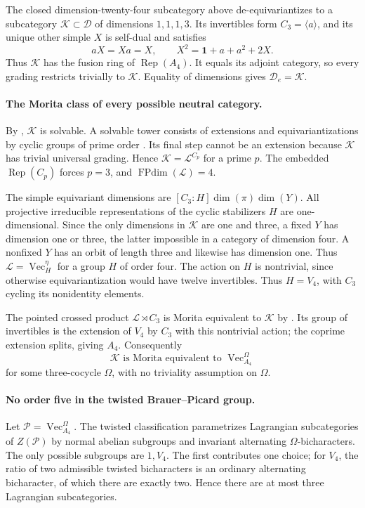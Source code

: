 The closed dimension-twenty-four subcategory above de-equivariantizes
to a subcategory $\mathcal K\subset\mathcal D$ of dimensions $1,1,1,3$.
Its invertibles form $C_3=\langle a\rangle$, and its unique other simple
$X$ is self-dual and satisfies
\[
 aX=Xa=X,\qquad X^2=\mathbf1+a+a^2+2X.
\]
Thus $\mathcal K$ has the fusion ring of $\operatorname{Rep}(A_4)$.
It equals its adjoint category, so every grading restricts trivially to
$\mathcal K$. Equality of dimensions gives $\mathcal D_e=\mathcal K$.

\paragraph{The Morita class of every possible neutral category.}
By \cite[Theorem~1.6]{ENOSolvable}, $\mathcal K$ is solvable. A solvable
tower consists of extensions and equivariantizations by cyclic groups of
prime order \cite[Definition~1.2 and Proposition~4.4]{ENOSolvable}.
Its final step cannot be an extension because $\mathcal K$ has trivial
universal grading. Hence $\mathcal K=\mathcal L^{C_p}$ for a prime $p$.
The embedded $\operatorname{Rep}(C_p)$ forces $p=3$, and
$\operatorname{FPdim}(\mathcal L)=4$.

The simple equivariant dimensions are $[C_3:H]\dim(\pi)\dim(Y)$.
All projective irreducible representations of the cyclic stabilizers $H$
are one-dimensional. Since the only dimensions in $\mathcal K$ are one
and three, a fixed $Y$ has dimension one or three, the latter impossible
in a category of dimension four. A nonfixed $Y$ has an orbit of length
three and likewise has dimension one. Thus
$\mathcal L=\operatorname{Vec}_H^\eta$ for a group $H$ of order four.
The action on $H$ is nontrivial, since otherwise equivariantization would
have twelve invertibles. Thus $H=V_4$, with $C_3$ cycling its nonidentity
elements.

The pointed crossed product $\mathcal L\rtimes C_3$ is Morita equivalent
to $\mathcal K$ by \cite[Proposition~2.2]{ENOSolvable}. Its group of
invertibles is the extension of $V_4$ by $C_3$ with this nontrivial action;
the coprime extension splits, giving $A_4$. Consequently
\[
 \mathcal K\text{ is Morita equivalent to }\operatorname{Vec}_{A_4}^\Omega
\]
for some three-cocycle $\Omega$, with no triviality assumption on $\Omega$.

\paragraph{No order five in the twisted Brauer--Picard group.}
Let $\mathcal P=\operatorname{Vec}_{A_4}^\Omega$.
The twisted classification \cite[Theorem~1.2, or Theorem~4.12]{NaiduNikshych}
parametrizes Lagrangian subcategories of $Z(\mathcal P)$ by normal abelian
subgroups and invariant alternating $\Omega$-bicharacters.
The only possible subgroups are $1,V_4$. The first contributes one choice;
for $V_4$, the ratio of two admissible twisted bicharacters is an ordinary
alternating bicharacter, of which there are exactly two. Hence there are
at most three Lagrangian subcategories.

